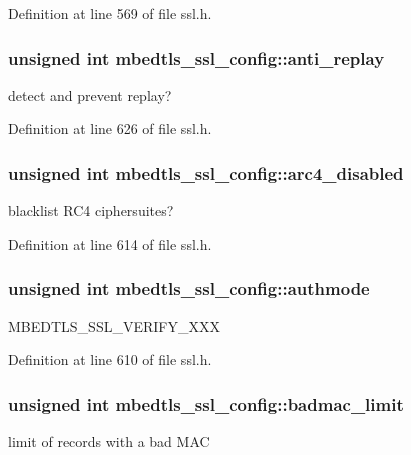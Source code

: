 Definition at line 569 of file ssl.\-h.

\hypertarget{structmbedtls__ssl__config_af636d34975cc5ced1aa32cb424a37c67}{
\subsubsection[{anti\-\_\-replay}]{\setlength{\rightskip}{0pt plus 5cm}unsigned int mbedtls\-\_\-ssl\-\_\-config\-::anti\-\_\-replay}}\label{structmbedtls__ssl__config_af636d34975cc5ced1aa32cb424a37c67}
detect and prevent replay? 

Definition at line 626 of file ssl.\-h.

\hypertarget{structmbedtls__ssl__config_a7155fd95a3206146ef1374341d008e92}{
\subsubsection[{arc4\-\_\-disabled}]{\setlength{\rightskip}{0pt plus 5cm}unsigned int mbedtls\-\_\-ssl\-\_\-config\-::arc4\-\_\-disabled}}\label{structmbedtls__ssl__config_a7155fd95a3206146ef1374341d008e92}
blacklist R\-C4 ciphersuites? 

Definition at line 614 of file ssl.\-h.

\hypertarget{structmbedtls__ssl__config_a0d3c2ea8eaf59a5acfcdb6b123148c1f}{
\subsubsection[{authmode}]{\setlength{\rightskip}{0pt plus 5cm}unsigned int mbedtls\-\_\-ssl\-\_\-config\-::authmode}}\label{structmbedtls__ssl__config_a0d3c2ea8eaf59a5acfcdb6b123148c1f}
M\-B\-E\-D\-T\-L\-S\-\_\-\-S\-S\-L\-\_\-\-V\-E\-R\-I\-F\-Y\-\_\-\-X\-X\-X 

Definition at line 610 of file ssl.\-h.

\hypertarget{structmbedtls__ssl__config_ab61653cfcc80cc9d0d902705212c6e4e}{
\subsubsection[{badmac\-\_\-limit}]{\setlength{\rightskip}{0pt plus 5cm}unsigned int mbedtls\-\_\-ssl\-\_\-config\-::badmac\-\_\-limit}}\label{structmbedtls__ssl__config_ab61653cfcc80cc9d0d902705212c6e4e}
limit of records with a bad M\-A\-C 


